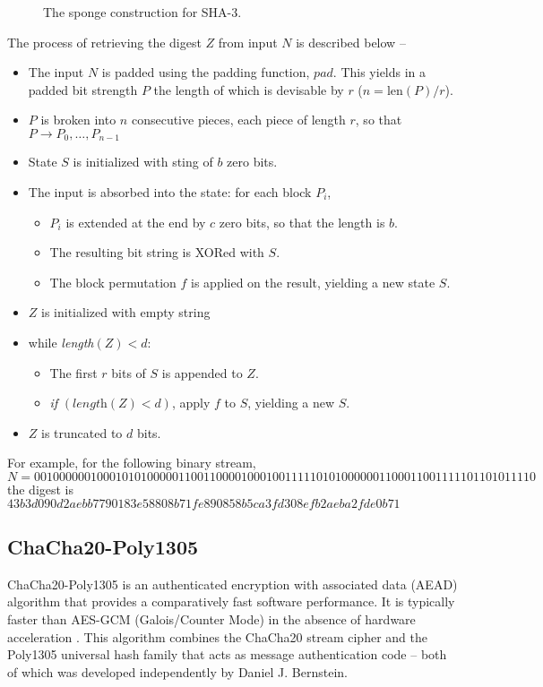 \documentclass{article}
\begin{document}
\begin{figure}[!h]
    \centering
    
    \caption{The sponge construction for SHA-3.}
    \label{fig:sponge}
\end{figure}

The process of retrieving the digest $Z$ from input $N$ is described below --
\begin{itemize}
    \item The input $N$ is padded using the padding function, $pad$. This yields in a padded bit strength $P$ the length of which is devisable by $r$ ($n=\text{len}(P)/r$).
    \item $P$ is broken into $n$ consecutive pieces, each piece of length $r$, so that $P \to P_{0},\ldots,P_{n-1}$
    \item State $S$ is initialized with sting of $b$ zero bits.
    \item The input is absorbed into the state: for each block $P_{i}$, \begin{itemize}
              \item $P_{i}$ is extended at the end by $c$ zero bits, so that the length is $b$.
              \item The resulting bit string is XORed with $S$.
              \item The block permutation $f$ is applied on the result, yielding a new state $S$.
          \end{itemize}
    \item $Z$ is initialized with empty string
    \item while \textit{length}$(Z)<d$:\begin{itemize}
              \item The first $r$ bits of $S$ is appended to $Z$.
              \item \textit{if} $(\textit{length}(Z)<d)$, apply $f$ to $S$, yielding a new $S$.
          \end{itemize}
    \item $Z$ is truncated to $d$ bits.
\end{itemize}

For example, for the following binary stream, \[N=00100000010001010100000110011000010001001111101010000001100011001111101101011110\]
the digest is $43b3d090d2aebb7790183e58808b71fe890858b5ca3fd308efb2aeba2fde0b71$
\subsection{ChaCha20-Poly1305}
\label{sec:chacha20}
ChaCha20-Poly1305 is an authenticated encryption with associated data (AEAD) algorithm that provides a comparatively fast software performance. It is typically faster than AES-GCM (Galois/Counter Mode) in the absence of hardware acceleration \cite{rfc7539}. This algorithm combines the ChaCha20 stream cipher \cite{bernstein2008chacha} and the Poly1305 \cite{bernstein2005poly1305} universal hash family that acts as message authentication code -- both of which was developed independently by Daniel J. Bernstein.
\end{document}
